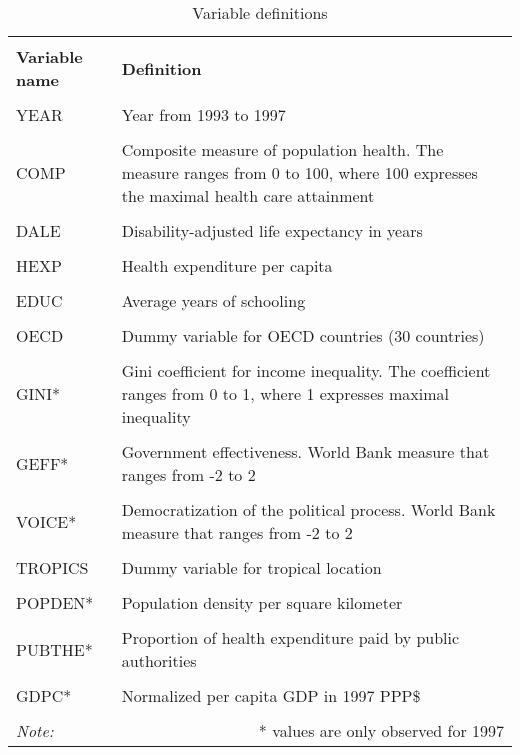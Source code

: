 \documentclass[12pt,a4paper]{article}\usepackage[]{graphicx}\usepackage[]{color}
\begin{document}
\begin{table}[htbp] \centering 
   \caption{Variable definitions} 
   \label{Variable definitions} 
   \normalsize
 \begin{tabular}{p{3cm} p{9cm}} 
 \\[-1.8ex]\hline 
\hline \\[-1.8ex]
\textbf{Variable name} & \textbf{Definition} \\
\hline \\[-1.8ex]
YEAR & Year from 1993 to 1997 \\
\hline \\[-1.8ex]
COMP & Composite measure of population health. The measure ranges from 0 to 100, where 100 expresses the maximal health care attainment \\
\hline \\[-1.8ex]
DALE & Disability-adjusted life expectancy in years \\
\hline \\[-1.8ex]
HEXP & Health expenditure per capita \\
\hline \\[-1.8ex]
EDUC & Average years of schooling \\
\hline \\[-1.8ex]
OECD & Dummy variable for OECD countries (30 countries) \\
\hline \\[-1.8ex]
GINI* & Gini coefficient for income inequality. The coefficient ranges from 0 to 1, where 1 expresses maximal inequality \\
\hline \\[-1.8ex]
GEFF* & Government effectiveness. World Bank measure that ranges from -2 to 2 \\
\hline \\[-1.8ex]
VOICE* & Democratization of the political process. World Bank measure that ranges from -2 to 2 \\
\hline \\[-1.8ex]
TROPICS & Dummy variable for tropical location \\
\hline \\[-1.8ex]
POPDEN* & Population density per square kilometer \\
\hline \\[-1.8ex]
PUBTHE* & Proportion of health expenditure paid by public authorities \\
\hline \\[-1.8ex]
GDPC* & Normalized per capita GDP in 1997 PPP\$ \\
\hline
\hline \\[-1.8ex]
\textit{Note:} & \multicolumn{1}{r}{* values are only observed for 1997} \\
\end{tabular}
\end{table}
\end{document}
